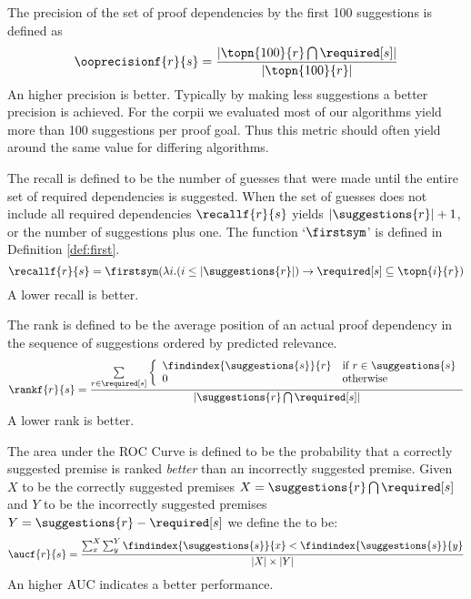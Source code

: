 \begin{definition}[\ooprecision]
  The precision of the set of proof dependencies by the first 100 suggestions is defined as
  \[ \ooprecisionf{r}{s} = \frac{ |\topn{100}{r} \bigcap \required[s]| } { |\topn{100}{r}| } \]
  An higher precision is better.
  Typically by making less suggestions a better precision is achieved.
  For the corpii we evaluated most of our algorithms yield more than 100 suggestions per proof goal.
  Thus this metric should often yield around the same value for differing algorithms.
\end{definition}

\begin{definition}[\recall]
  The recall is defined to be the number of guesses that were made until the entire set of required dependencies is suggested.
  When the set of guesses does not include all required dependencies $\recallf{r}{s}$ yields $|\suggestions{r}|+1$,
  or the number of suggestions plus one.
  The function `$\firstsym$' is defined in Definition \ref{def:first}.
  \[ \recallf{r}{s} = \firstsym(\lambda i. (i \leq |\suggestions{r}|) \rightarrow \required[s] \subseteq \topn{i}{r}) \]
  A lower recall is better.
\end{definition}

\begin{definition}[\rank]
  The rank is defined to be the average position of an actual proof dependency in the sequence of suggestions ordered by predicted relevance.
  \[ \rankf{r}{s} = \frac{
      \sum\limits_{r \in \required[s]} \left\{
        \begin{array}{ll}
          \findindex{\suggestions{s}}{r} & \text{if~} r \in \suggestions{s} \\
          0 & \text{otherwise} \\
        \end{array}
        \right.
    }{
      |\suggestions{r} \bigcap \required[s]|
    }
  \]
  A lower rank is better.
\end{definition}

\begin{definition}
  The area under the ROC Curve is defined to be the probability that a correctly suggested premise is ranked \emph{better} than an incorrectly suggested premise.
  Given $X$ to be the correctly suggested premises $X = \suggestions{r} \bigcap \required[s]$ and $Y$ to be the incorrectly suggested premises $Y = \suggestions{r} - \required[s]$ we define the \auc to be:
  \[
    \aucf{r}{s} = \frac{
      \sum_x^X \sum_y^Y {\findindex{\suggestions{s}}{x} < \findindex{\suggestions{s}}{y}}
    }{
      |X| \times |Y|
    }
  \]
  An higher AUC indicates a better performance.
\end{definition}
